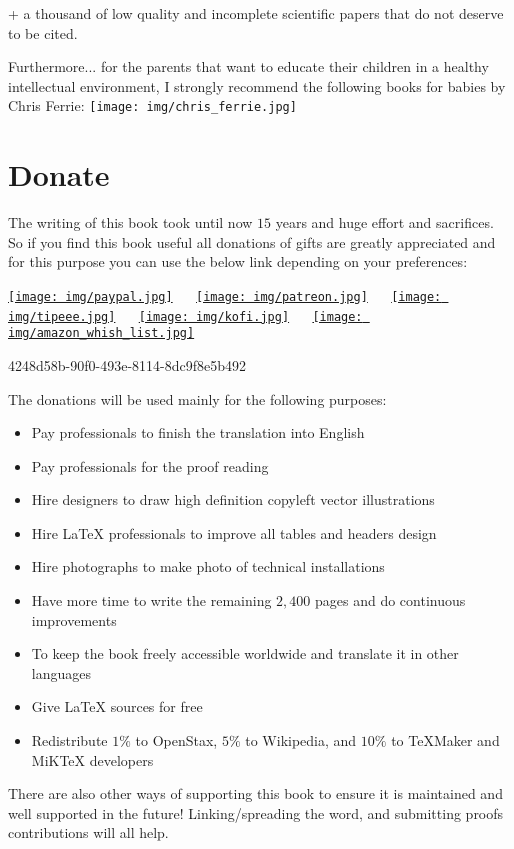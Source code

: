 \documentclass[12pt,a4paper,twoside,openright]{report}
\newcounter{def}
\theoremstyle{definition}
\theoremstyle{itexmp}
\numberwithin{equation}{section}
\begin{document}
	\nocite{*}
	\printbibliography[prenote=myprenote]
	
	+ a thousand of low quality and incomplete scientific papers that do not deserve to be cited.
	
	Furthermore... for the parents that want to educate their children in a healthy intellectual environment, I strongly recommend the following books for babies by Chris Ferrie:
	\texttt{[image: img/chris\_ferrie.jpg]}
	
	\cleardoublepage
	\printindex
	
	\chapter{Donate}
	The writing of this book took until now $15$ years and huge effort and sacrifices. So if you find this book useful all donations of gifts are greatly appreciated and for this purpose you can use the below link depending on your preferences:
	
	\begin{center}
	\href{https://www.paypal.me/scientificevolution}{\texttt{[image: img/paypal.jpg]}} $\quad$ \href{https://www.patreon.com/sciences}{\texttt{[image: img/patreon.jpg]}} $\quad$ \href{https://www.tipeee.com/elements-of-applied-mathematics}{\texttt{[image: img/tipeee.jpg]}} $\quad$ \href{http://ko-fi.com/operamagistris}{\texttt{[image: img/kofi.jpg]}} $\quad$ \href{http://a.co/cqLIx5V}{\texttt{[image: img/amazon\_whish\_list.jpg]}}
	\end{center}
	\begin{center}
		{\large \faBitcoin} 4248d58b-90f0-493e-8114-8dc9f8e5b492
	\end{center}
	The donations will be used mainly for the following purposes:
	\begin{itemize}
		\item Pay professionals to finish the translation into English
		\item Pay professionals for the proof reading
		\item Hire designers to draw high definition copyleft vector illustrations
		\item Hire \LaTeX{} professionals to improve all tables and headers design
		\item Hire photographs to make photo of technical installations
		\item Have more time to write the remaining $2,400$ pages and do continuous improvements
		\item To keep the book freely accessible worldwide and translate it in other languages
		\item Give \LaTeX{} sources for free
		\item Redistribute $1\%$ to OpenStax, $5\%$ to Wikipedia, and $10\%$ to TeXMaker and MiKTeX developers
	\end{itemize}
	There are also other ways of supporting this book to ensure it is maintained and well supported in the future! Linking/spreading the word, and submitting proofs contributions will all help.
	
\end{document}
